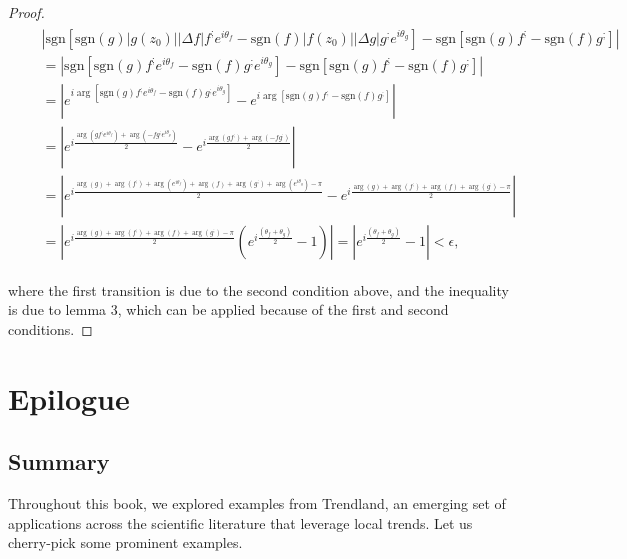 \documentclass[11pt]{book}
\begin{document}
\begin{proof}
\begin{align}
&\begin{aligned}
&\left|\text{sgn}\left[\text{sgn}\left(g\right)\left|g\left(z_{0}\right)\right|\left|\Delta f\right|f^{;}e^{i\theta_{f}}-\text{sgn}\left(f\right)\left|f\left(z_{0}\right)\right|\left|\Delta g\right|g^{;}e^{i\theta_{g}}\right]-\text{sgn}\left[\text{sgn}\left(g\right)f^{;}-\text{sgn}\left(f\right)g^{;}\right]\right| \\
&=\left|\text{sgn}\left[\text{sgn}\left(g\right)f^{;}e^{i\theta_{f}}-\text{sgn}\left(f\right)g^{;}e^{i\theta_{g}}\right]-\text{sgn}\left[\text{sgn}\left(g\right)f^{;}-\text{sgn}\left(f\right)g^{;}\right]\right| \\
&=\left|e^{i\arg\left[\text{sgn}\left(g\right)f^{;}e^{i\theta_{f}}-\text{sgn}\left(f\right)g^{;}e^{i\theta_{g}}\right]}-e^{i\arg\left[\text{sgn}\left(g\right)f^{;}-\text{sgn}\left(f\right)g^{;}\right]}\right| \\
&=\left|e^{i\frac{\arg\left(gf^{;}e^{i\theta_{f}}\right)+\arg\left(-fg^{;}e^{i\theta_{g}}\right)}{2}}-e^{i\frac{\arg\left(gf^{;}\right)+\arg\left(-fg^{;}\right)}{2}}\right| \\
&=\left|e^{i\frac{\arg\left(g\right)+\arg\left(f^{;}\right)+\arg\left(e^{i\theta_{f}}\right)+\arg\left(f\right)+\arg\left(g^{;}\right)+\arg\left(e^{i\theta_{g}}\right)-\pi}{2}}-e^{i\frac{\arg\left(g\right)+\arg\left(f^{;}\right)+\arg\left(f\right)+\arg\left(g^{;}\right)-\pi}{2}}\right| \\
&=\left|e^{i\frac{\arg\left(g\right)+\arg\left(f^{;}\right)+\arg\left(f\right)+\arg\left(g^{;}\right)-\pi}{2}}\left(e^{i\frac{\left(\theta_{f}+\theta_{g}\right)}{2}}-1\right)\right|=\left|e^{i\frac{\left(\theta_{f}+\theta_{g}\right)}{2}}-1\right|<\epsilon,
\end{aligned}
\end{align}

where the first transition is due to the second condition above, and the inequality is due to lemma 3, which can be applied because of the first and second conditions.
\end{proof}

\part{Epilogue}
\chapter{Summary}
Throughout this book, we explored examples from Trendland, an emerging set of applications across the scientific literature that leverage local trends. Let us cherry-pick some prominent examples.
\end{document}
